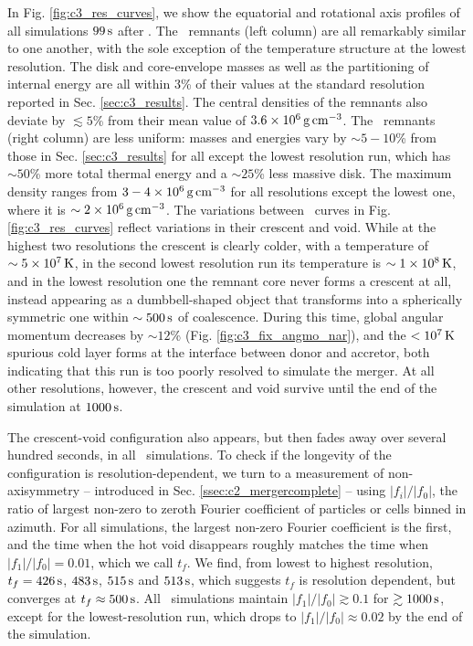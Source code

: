 In Fig. \ref{fig:c3_res_curves}, we show the equatorial and rotational axis profiles of all simulations $99\,\mathrm{s}$ after \tcoal.  The \gasoline\ remnants (left column) are all remarkably similar to one another, with the sole exception of the temperature structure at the lowest resolution.  The disk and core-envelope masses as well as the partitioning of internal energy are all within $3$\% of their values at the standard resolution reported in Sec. \ref{sec:c3_results}.  The central densities of the remnants also deviate by $\lesssim5$\% from their mean value of $3.6\times10^{6}\,\gcc$.  The \arepo\ remnants (right column) are less uniform: masses and energies vary by $\sim5-10$\% from those in Sec. \ref{sec:c3_results} for all except the lowest resolution run, which has $\sim50$\% more total thermal energy and a $\sim25$\% less massive disk.  The maximum density ranges from $3-4\times10^6\,\gcc$ for all resolutions except the lowest one, where it is $\sim2\times10^6\,\gcc$.  The variations between \arepo\ curves in Fig. \ref{fig:c3_res_curves} reflect variations in their crescent and void.  While at the highest two resolutions the crescent is clearly colder, with a temperature of $\sim5\times10^7\,\mathrm{K}$, in the second lowest resolution run its temperature is $\sim1\times10^8\,\mathrm{K}$, and in the lowest resolution one the remnant core never forms a crescent at all, instead appearing as a dumbbell-shaped object that transforms into a spherically symmetric one within $\sim500\,\mathrm{s}$ of coalescence.  During this time, global angular momentum decreases by $\sim12$\% (Fig. \ref{fig:c3_fix_angmo_nar}), and the $<10^7\,\mathrm{K}$ spurious cold layer forms at the interface between donor and accretor, both indicating that this run is too poorly resolved to simulate the merger.  At all other resolutions, however, the crescent and void survive until the end of the simulation at $1000\,\mathrm{s}$.

The crescent-void configuration also appears, but then fades away over several hundred seconds, in all \gasoline\ simulations.  To check if the longevity of the configuration is resolution-dependent, we turn to a measurement of non-axisymmetry -- introduced in Sec. \ref{ssec:c2_mergercomplete} -- using $|f_i|/|f_0|$, the ratio of largest non-zero to zeroth Fourier coefficient of particles or cells binned in azimuth.  For all simulations, the largest non-zero Fourier coefficient is the first, and the time when the hot void disappears roughly matches the time when $|f_1|/|f_0| = 0.01$, which we call $t_f$.  We find, from lowest to highest resolution, $t_f = 426\,\mathrm{s}$, $483\,\mathrm{s}$, $515\,\mathrm{s}$ and $513\,\mathrm{s}$, which suggests $t_f$ is resolution dependent, but converges at $t_f \approx 500\,\mathrm{s}$.   All \arepo\ simulations maintain $|f_1|/|f_0| \gtrsim 0.1$ for $\gtrsim 1000\,\mathrm{s}$, except for the lowest-resolution run, which drops to $|f_1|/|f_0| \approx 0.02$ by the end of the simulation.

